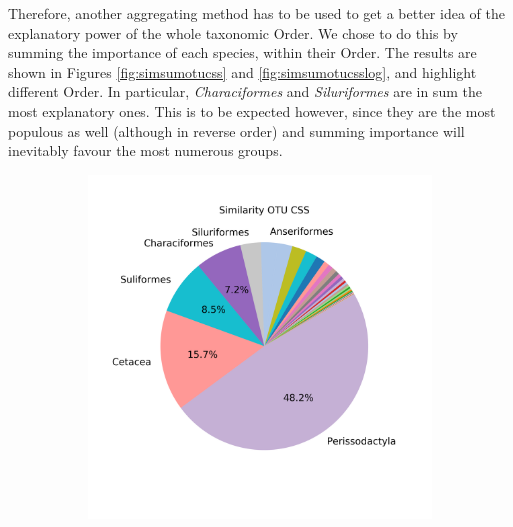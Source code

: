 Therefore, another aggregating method has to be used to get a better idea of the explanatory power of the whole taxonomic Order. We chose to do this by summing the importance of each species, within their Order. The results are shown in Figures \ref{fig:simsumotucss} and \ref{fig:simsumotucsslog}, and highlight different Order. In particular, \textit{Characiformes }and \textit{Siluriformes} are in sum the most explanatory ones. This is to be expected however, since they are the most populous as well (although in reverse order) and summing importance will inevitably favour the most numerous groups. 



\begin{figure}[h]
	\centering

	\begin{subfigure}{0.45\textwidth}
	\includegraphics[width=\textwidth]{rfr_sim_mean_pieOTU CSS}
	\caption{}
	\label{fig:simmeanotucss}
	\end{subfigure}	
	\begin{subfigure}{0.45\textwidth}

\end{subfigure}
\end{figure}
